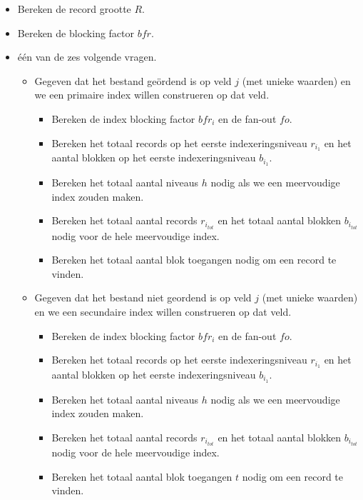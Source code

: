 \documentclass[indexstructuren.tex]{subfiles}
\begin{document}
\begin{itemize}
\item Bereken de record grootte $R$.
\item Bereken de blocking factor $bfr$.
\item \'e\'en van de zes volgende vragen.
\begin{itemize}
\item Gegeven dat het bestand ge\"ordend is op veld $j$ (met unieke waarden) en we een primaire index willen construeren op dat veld.
\begin{itemize}
\item Bereken de index blocking factor $bfr_i$ en de fan-out $fo$.
\item Bereken het totaal records op het eerste indexeringsniveau $r_{i_1}$ en het aantal blokken op het eerste indexeringsniveau $b_{i_1}$.
\item Bereken het totaal aantal niveaus $h$ nodig als we een meervoudige index zouden maken. 
\item Bereken het totaal aantal records $r_{i_{tot}}$ en het totaal aantal blokken $b_{i_{tot}}$ nodig voor de hele meervoudige index.
\item Bereken het totaal aantal blok toegangen nodig om een record te vinden.
\end{itemize}

\item
Gegeven dat het bestand niet geordend is op veld $j$ (met unieke waarden) en we een secundaire index willen construeren op dat veld.
\begin{itemize}
\item Bereken de index blocking factor $bfr_i$ en de fan-out $fo$.
\item Bereken het totaal records op het eerste indexeringsniveau $r_{i_1}$ en het aantal blokken op het eerste indexeringsniveau $b_{i_1}$.
\item Bereken het totaal aantal niveaus $h$ nodig als we een meervoudige index zouden maken. 
\item Bereken het totaal aantal records $r_{i_{tot}}$ en het totaal aantal blokken $b_{i_{tot}}$ nodig voor de hele meervoudige index.
\item Bereken het totaal aantal blok toegangen $t$ nodig om een record te vinden.
\end{itemize}


\end{itemize}
\end{itemize}
\end{document}
